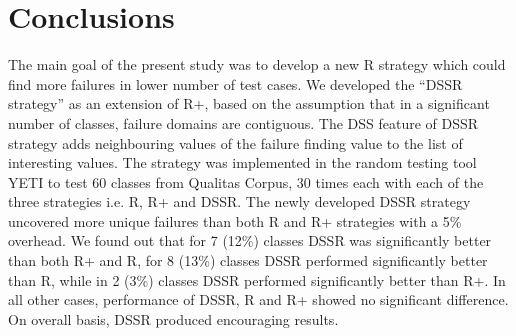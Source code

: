 

\section{Conclusions}\label{sec:conc}
The main goal of the present study was to develop a new R strategy which could find more failures in lower number of test cases. We developed the ``DSSR strategy'' as an extension of R+, based on the assumption that in a significant number of classes, failure domains are contiguous. The DSS feature of DSSR strategy adds neighbouring values of the failure finding value to the list of interesting values. The strategy was implemented in the random testing tool YETI to test 60 classes from Qualitas Corpus, 30 times each with each of the three strategies i.e. R, R+ and DSSR. The newly developed DSSR strategy uncovered more unique failures than both R and R+ strategies with a 5\% overhead. We found out that for 7 (12\%) classes DSSR was significantly better than both R+ and R, for 8 (13\%) classes DSSR performed significantly better than R, while in 2 (3\%) classes DSSR performed significantly better than R+. In all other cases, performance of DSSR, R and R+ showed no significant difference. On overall basis, DSSR produced encouraging results. 


